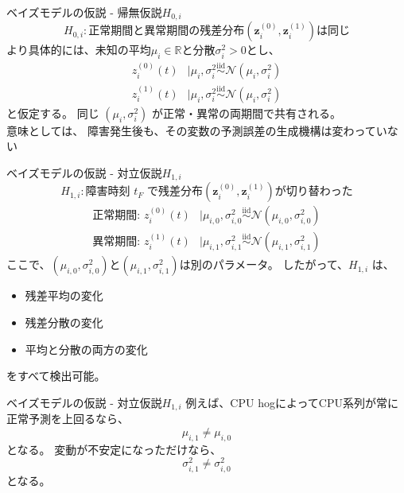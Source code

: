 \documentclass[dvipdfmx, 11pt, aspectratio=169, notheorems]{beamer}
\begin{document}
\begin{frame}{ベイズモデルの仮説 - 帰無仮説$H_{0,i}$}
    \[H_{0,i}:\text{正常期間と異常期間の残差分布}(\boldsymbol z_i^{(0)}, \boldsymbol z_i^{(1)})\text{は同じ}\]
    より具体的には、未知の平均$\mu_i\in\mathbb R$と分散$\sigma_i^2>0$とし、
    \begin{align}
        z_i^{(0)}(t) &\mid \mu_i,\sigma_i^2 \overset{\mathrm{iid}}{\sim} \mathcal N(\mu_i,\sigma_i^2) \\
        z_i^{(1)}(t) &\mid \mu_i,\sigma_i^2 \overset{\mathrm{iid}}{\sim} \mathcal N(\mu_i,\sigma_i^2) 
    \end{align}
    と仮定する。
    同じ $(\mu_i,\sigma_i^2)$ が正常・異常の両期間で共有される。\\
    意味としては、
    障害発生後も、その変数の予測誤差の生成機構は変わっていない
\end{frame}

\begin{frame}{ベイズモデルの仮説 - 対立仮説$H_{1,i}$}
    \[ H_{1,i}: \text{障害時刻 }t_F\text{ で残差分布}(\boldsymbol z_i^{(0)}, \boldsymbol z_i^{(1)})\text{が切り替わった} \]
    \begin{align}
        \text{正常期間:\ } z_i^{(0)}(t) &\mid \mu_{i,0},\sigma_{i,0}^2 \overset{\mathrm{iid}}{\sim} \mathcal N(\mu_{i,0},\sigma_{i,0}^2) \\
        \text{異常期間:\ } z_i^{(1)}(t) &\mid \mu_{i,1},\sigma_{i,1}^2 \overset{\mathrm{iid}}{\sim} \mathcal N(\mu_{i,1},\sigma_{i,1}^2)
    \end{align}
    ここで、$(\mu_{i,0},\sigma_{i,0}^2)$と$(\mu_{i,1},\sigma_{i,1}^2)$は別のパラメータ。
    したがって、\(H_{1,i}\) は、
    \begin{itemize}
        \item 残差平均の変化
        \item 残差分散の変化
        \item 平均と分散の両方の変化
    \end{itemize}
    をすべて検出可能。
\end{frame}

\begin{frame}{ベイズモデルの仮説 - 対立仮説$H_{1,i}$}
    例えば、CPU hogによってCPU系列が常に正常予測を上回るなら、
    \[
    \mu_{i,1}\neq\mu_{i,0}
    \]となる。
    変動が不安定になっただけなら、
    \[
    \sigma_{i,1}^2\neq\sigma_{i,0}^2
    \]
    となる。
\end{frame}
\end{document}
